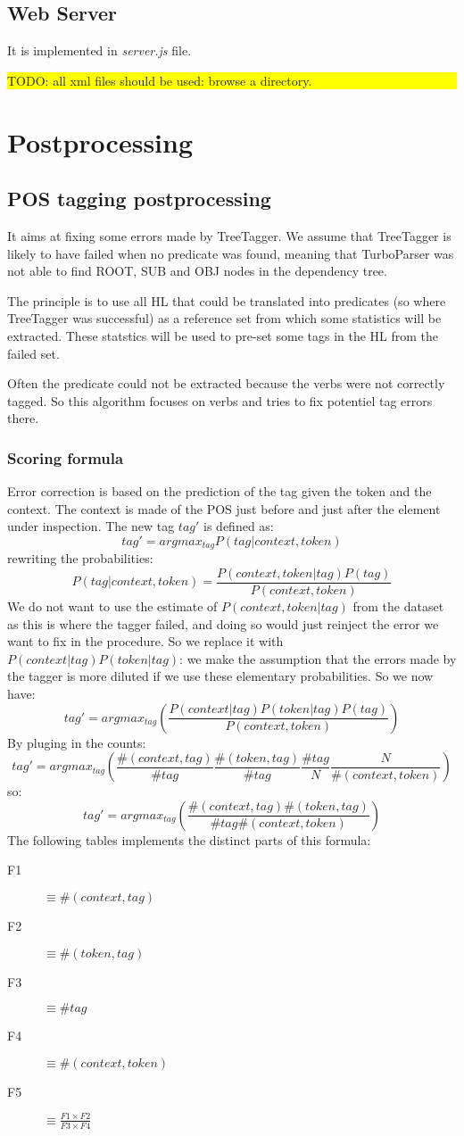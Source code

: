\documentclass[a4paper,11pt]{report}
\newcommand{\TODO}[1]{\begin{center}\bfseries \colorbox{yellow}{\parbox{0.9\textwidth}{TODO: #1}}\end{center}}
\begin{document}
\section{Web Server}
It is implemented in \emph{server.js} file. 

\TODO{all xml files should be used: browse a directory.}

\chapter{Postprocessing}
\section{POS tagging postprocessing}
It aims at fixing some errors made by TreeTagger. We assume that TreeTagger is likely to have failed when no predicate was found, meaning that TurboParser was not able to find ROOT, SUB and OBJ nodes in the dependency tree.

The principle is to use all HL that could be translated into predicates (so where TreeTagger was successful) as a reference set from which some statistics will be extracted. These statstics will be used to pre-set some tags in the HL from the failed set.

Often the predicate could not be extracted because the verbs were not correctly tagged. So this algorithm focuses on verbs and tries to fix potentiel tag errors there.
\subsection*{Scoring formula}
Error correction is based on the prediction of the tag given the token and the context. The context is made of the POS just before and just after the element under inspection. The new tag $tag\prime$ is defined as:
$$
tag\prime = argmax_{tag} P(tag|context,token)
$$
rewriting the probabilities:
$$
P(tag|context,token)=\frac{P(context,token|tag)P(tag)}{P(context,token)}
$$
We do not want to use the estimate of $P(context,token|tag)$ from the dataset as this is where the tagger failed, and doing so would just reinject the error we want to fix in the procedure. So we replace it with $P(context|tag)P(token|tag)$: we make the assumption that the errors made by the tagger is more diluted if we use these elementary probabilities. So we now have:
$$
tag\prime = argmax_{tag}\left(\frac{P(context|tag)P(token|tag)P(tag)}{P(context,token)}\right)
$$
By pluging in the counts:
$$
tag\prime = argmax_{tag}\left(\frac{\#(context,tag)}{\#tag}\frac{\#(token,tag)}{\#tag}\frac{\#tag}{N}\frac{N}{\#(context,token)}\right)
$$
so:
$$
tag\prime = argmax_{tag}\left(\frac{\#(context,tag) \#(token,tag)}{\#tag \#(context,token)}\right)
$$
The following tables implements the distinct parts of this formula:
\begin{description}
\item[F1] $\equiv \#(context,tag)$
\item[F2] $\equiv \#(token,tag)$
\item[F3] $\equiv \#tag$
\item[F4] $\equiv \#(context,token)$
\item[F5] $\equiv \frac{F1\times F2}{F3\times F4}$
\end{description}
\end{document}
